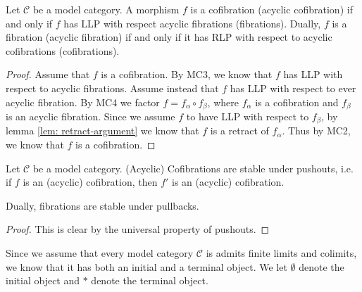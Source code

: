\documentclass[../thesis.tex]{subfiles}
\begin{document}
            \begin{proposition}
                Let $\mathcal{C}$ be a model category. A morphism $f$ is a cofibration (acyclic cofibration) if and only if $f$ has LLP with respect acyclic fibrations (fibrations). Dually, $f$ is a fibration (acyclic fibration) if and only if it has RLP with respect to acyclic cofibrations (cofibrations).
            \end{proposition}

            \begin{proof}
            Assume that $f$ is a cofibration. By MC3, we know that $f$ has LLP with respect to acyclic fibrations. Assume instead that $f$ has LLP with respect to ever acyclic fibration. By MC4 we factor $f = f_\alpha\circ f_\beta$, where $f_\alpha$ is a cofibration and $f_\beta$ is an acyclic fibration. Since we assume $f$ to have LLP with respect to $f_\beta$, by lemma \ref{lem: retract-argument} we know that $f$ is a retract of $f_\alpha$. Thus by MC2, we know that $f$ is a cofibration. 
            \end{proof}

            \begin{corollary}\label{cor: stable-cofib-base-change}
                Let $\mathcal{C}$ be a model category. (Acyclic) Cofibrations are stable under pushouts, i.e. if $f$ is an (acyclic) cofibration, then $f'$ is an (acyclic) cofibration.
                \begin{center}
                \end{center}
                Dually, fibrations are stable under pullbacks.
            \end{corollary}

            \begin{proof}
                This is clear by the universal property of pushouts.
            \end{proof}

            Since we assume that every model category $\mathcal{C}$ is admits finite limits and colimits, we know that it has both an initial and a terminal object. We let $\emptyset$ denote the initial object and $*$ denote the terminal object. 
\end{document}
